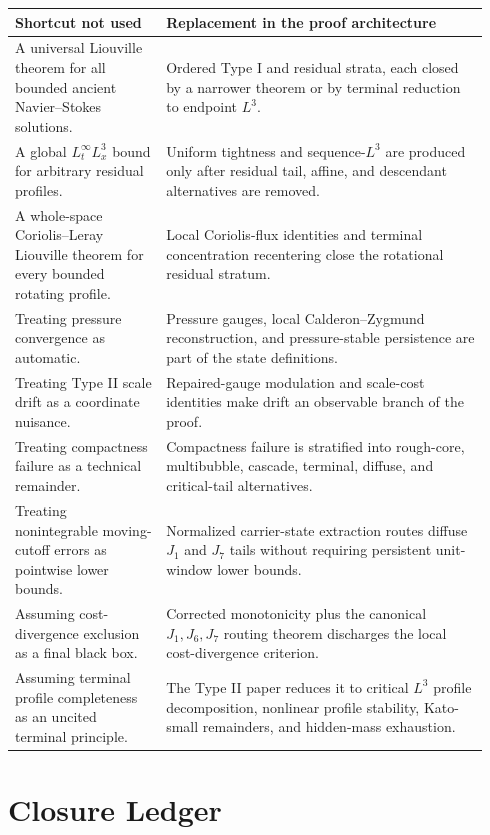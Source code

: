 \documentclass[11pt]{amsart}
\begin{document}
\begin{longtable}{@{}>{\raggedright\arraybackslash}p{0.30\linewidth}>{\raggedright\arraybackslash}p{0.64\linewidth}@{}}
\toprule
\textbf{Shortcut not used} & \textbf{Replacement in the proof architecture} \\
\midrule
\endhead
A universal Liouville theorem for all bounded ancient Navier--Stokes solutions. & Ordered Type I and residual strata, each closed by a narrower theorem or by terminal reduction to endpoint \(L^3\). \\
A global \(L^\infty_tL^3_x\) bound for arbitrary residual profiles. & Uniform tightness and sequence-\(L^3\) are produced only after residual tail, affine, and descendant alternatives are removed. \\
A whole-space Coriolis--Leray Liouville theorem for every bounded rotating profile. & Local Coriolis-flux identities and terminal concentration recentering close the rotational residual stratum. \\
Treating pressure convergence as automatic. & Pressure gauges, local Calderon--Zygmund reconstruction, and pressure-stable persistence are part of the state definitions. \\
Treating Type II scale drift as a coordinate nuisance. & Repaired-gauge modulation and scale-cost identities make drift an observable branch of the proof. \\
Treating compactness failure as a technical remainder. & Compactness failure is stratified into rough-core, multibubble, cascade, terminal, diffuse, and critical-tail alternatives. \\
Treating nonintegrable moving-cutoff errors as pointwise lower bounds. & Normalized carrier-state extraction routes diffuse \(J_1\) and \(J_7\) tails without requiring persistent unit-window lower bounds. \\
Assuming cost-divergence exclusion as a final black box. & Corrected monotonicity plus the canonical \(J_1,J_6,J_7\) routing theorem discharges the local cost-divergence criterion. \\
Assuming terminal profile completeness as an uncited terminal principle. & The Type II paper reduces it to critical \(L^3\) profile decomposition, nonlinear profile stability, Kato-small remainders, and hidden-mass exhaustion. \\
\bottomrule
\end{longtable}

\section{Closure Ledger}
\end{document}
